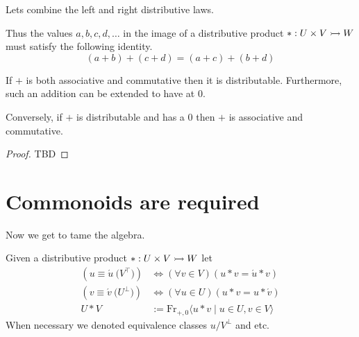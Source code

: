 Lets combine the left and right 
distributive laws.

\begin{center}
\end{center}
Thus the values $a,b,c,d,\ldots $ in the image of a distributive product $*:U\times V\rightarrowtail W$ must 
satisfy the following identity.
\begin{equation}
    \tag{Distributable}
    (a+b)+(c+d) = (a+c)+(b+d)
\end{equation}

\begin{proposition}
    If $+$ is both associative and commutative then it is distributable.
    Furthermore, such an addition can be extended to have at $0$.

    Conversely, if $+$ is distributable and has a $0$ then $+$ is associative 
    and commutative.
\end{proposition}
\begin{proof}
    TBD
\end{proof}



\section{Commonoids are required}

Now we get to tame the algebra.  
\begin{definition}
    Given a distributive product $*:U\times V\rightarrowtail W$
    let 
    \begin{align*}
        (u\equiv \acute{u} \pod{V^{\top}}) & \Leftrightarrow (\forall v\in V)(u*v=\acute{u}*v)\\
        (v\equiv \acute{v} \pod{U^{\bot}}) & \Leftrightarrow (\forall u\in U)(u*v=u*\acute{v})\\
        U*V & := \text{Fr}_{+,0}\langle u*v \mid u\in U, v\in V\rangle
    \end{align*}
    When necessary we denoted equivalence classes $u/{V^{\bot}}$ and etc.
\end{definition}

